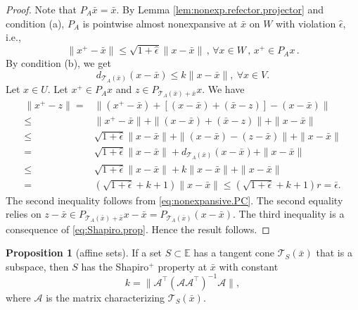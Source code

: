 \documentclass[12pt]{article}
\theoremstyle{definition}
\newtheorem{proposition}{Proposition}
\newcommand{\Ebb}{\mathbb{E}}
\begin{document}
\begin{proof}
Note that $P_A \bar x=\bar x$.
By Lemma \ref{lem:nonexp.refector.projector} and condition (a), $P_A$ is pointwise almost
nonexpansive at $\bar x$ on  $W$ with violation $\hat{\epsilon}$, i.e.,
\begin{equation}\label{eq:nonexpansive.PC}
    \|x^+-\bar x\|\le \sqrt{1+\hat{\epsilon}}\|x-\bar x\|\,,\,\forall x\in W\,,\,x^+\in P_A x\,.
\end{equation}
By condition (b), we get
\begin{equation}\label{eq:Shapiro.prop}
    d_{\mathcal{T}_{A}(\bar x)}(x-\bar x)\leq k\|x-\bar x\|,\ \forall x\in V.
\end{equation}
Let $x\in U$. Let $x^+\in P_A x$ and $z\in P_{\mathcal{T}_{A}(\bar x)+\bar x}x$.
We have
\begin{equation}
    \begin{array}{rl}
         \|x^+-z\|=&\|(x^+-\bar x) +[(x-\bar x)+(\bar x- z)]-(x-\bar x)\|  \\[5pt]
         \leq&\|x^+-\bar x\|+\|(x-\bar x)+(\bar x- z)\|+\|x-\bar x\|\\[5pt]
         \leq & \sqrt{1+\hat{\epsilon}}\|x-\bar x\|+\|(x-\bar x)-(z-\bar x)\|+\|x-\bar x\|\\[5pt]
         =&\sqrt{1+\hat{\epsilon}}\|x-\bar x\|+d_{\mathcal{T}_{A}(\bar x)}(x-\bar x)+\|x-\bar x\|\\[5pt]
         \leq &\sqrt{1+\hat{\epsilon}}\|x-\bar x\|+k\|x-\bar x\|+\|x-\bar x\|\\[5pt]
         =&(\sqrt{1+\hat{\epsilon}}+k+1)\|x-\bar x\|\le (\sqrt{1+\hat{\epsilon}}+k+1)r=\bar\epsilon.
    \end{array}
\end{equation}
The second inequality follows from \eqref{eq:nonexpansive.PC}.
The second equality relies on $z-\bar x\in P_{\mathcal{T}_{A}(\bar x)+\bar x}x-\bar x= P_{\mathcal{T}_{A}(\bar x)}(x-\bar x)$.
The third inequality is a consequence of \eqref{eq:Shapiro.prop}.
Hence the result follows.
\end{proof}

\begin{proposition}[affine sets]\label{t:T_S line-Shapiro+}
If a set $S\subset\Ebb$ has a tangent cone $\mathcal T_S(\bar x)$ that is a subspace, then $S$ has the
Shapiro$^+$ property at $\bar x$ with constant
\begin{equation}\label{eq:Shapiro number}
 k=\|\mathcal A^\top (\mathcal A\mathcal A^\top)^{-1}\mathcal A\|,
\end{equation}
where $\mathcal A$ is the matrix characterizing $\mathcal T_S(\bar x)$.
\end{proposition}
\end{document}
